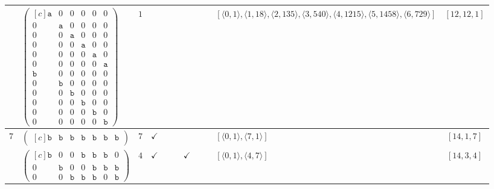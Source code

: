 \documentclass[12pt]{article}
\theoremstyle{definition}
\theoremstyle{plain}
\begin{document}
{\begin{longtable}{@{}cYcccccccZc@{}}
\cmidrule(lr){2-11}


& $\begin{pmatrix*}[c]
\mathtt{a}  &  0  &  0  &  0  &  0  &  0  \\
0  &  \mathtt{a}  &  0  &  0  &  0  &  0  \\
0  &  0  &  \mathtt{a}  &  0  &  0  &  0  \\
0  &  0  &  0  &  \mathtt{a} &  0  &  0  \\
0  &  0  &  0  &  0  &  \mathtt{a}  &  0  \\
0  &  0  &  0  &  0  &  0  &  \mathtt{a}  \\
\mathtt{b}  &  0  &  0  &  0  &  0  &  0  \\
0  &  \mathtt{b}  &  0  &  0  &  0  & 0  \\
0  &  0  &  \mathtt{b}  &  0  &  0  & 0   \\
0  &  0  &  0  &  \mathtt{b}  &  0   &  0  \\
0  &  0  &  0  &  0  &  \mathtt{b}   &  0  \\
0  &  0  &  0  &  0  &  0   &  \mathtt{b}
\end{pmatrix*}$
& $1$
&
&
&
&
&
&
& $[\langle0,1\rangle,\allowbreak\langle1,18\rangle,\allowbreak\langle2,135\rangle,\allowbreak\langle3,540\rangle,\allowbreak\langle4,1215\rangle,\allowbreak\langle5,1458\rangle,\allowbreak\langle6,729\rangle]$
& $[12,12,1]$     \\

\midrule[\heavyrulewidth]

$7$
& $\begin{pmatrix*}[c]
\mathtt{b}   &  \mathtt{b}    &  \mathtt{b}    &   \mathtt{b}  &  \mathtt{b}  &  \mathtt{b}  &  \mathtt{b}
\end{pmatrix*}$
& $7$
& $\checkmark$
&
&
&
&
&
& $[\langle0,1\rangle,\allowbreak\langle7,1\rangle]$
& $[14,1,7]$     \\

\cmidrule(lr){2-11}


& $\begin{pmatrix*}[c]
\mathtt{b}   &  0    &  0    &   \mathtt{b}  &  \mathtt{b}  &  \mathtt{b}  &  0  \\
0   &  \mathtt{b}    &  0    &   0  &  \mathtt{b}  &  \mathtt{b}  &  \mathtt{b}  \\
0   &  0    &  \mathtt{b}    &   \mathtt{b}  &  \mathtt{b}  &  0  &  \mathtt{b}
\end{pmatrix*}$
& $4$
& $\checkmark$
&
&
& $\checkmark$
&
&
& $[\langle0,1\rangle,\allowbreak\langle4,7\rangle]$
& $[14,3,4]$     \\


\end{longtable}}
\end{document}
